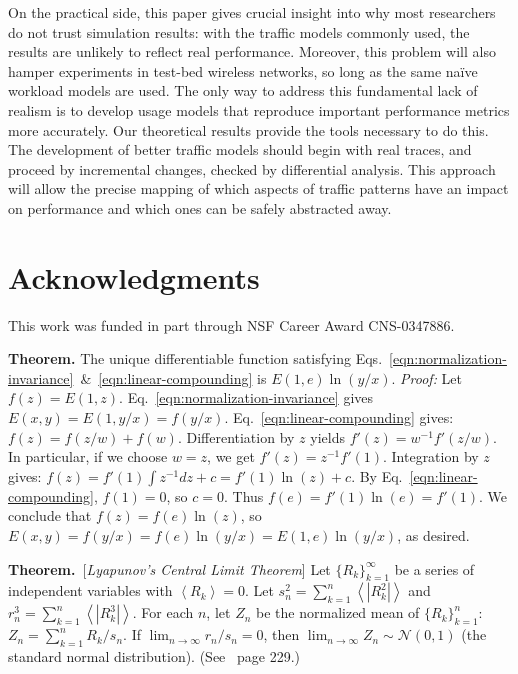 \documentclass[conference]{IEEEtran}
\newcommand{\E}[1]{\left<#1\right>}
\newcommand{\abs}[1]{\left|#1\right|}
\begin{document}
On the practical side, this paper gives crucial insight into why most researchers do not trust simulation results: with the traffic models commonly used, the results are unlikely to reflect real performance. Moreover, this problem will also hamper experiments in test-bed wireless networks, so long as the same na\"ive workload models are used. The only way to address this fundamental lack of realism is to develop usage models that reproduce important performance metrics more accurately. Our theoretical results provide the tools necessary to do this. The development of better traffic models should begin with real traces, and proceed by incremental changes, checked by differential analysis.
This approach will allow the precise mapping of which aspects of traffic patterns have an impact on performance and which ones can be safely abstracted away.

\section{Acknowledgments}
This work was funded in part through NSF Career Award CNS-0347886.

\vspace{-0.5em}
\appendix\footnotesize

\noindent
\textbf{Theorem.} The unique differentiable function satisfying Eqs.~\ref{eqn:normalization-invariance}~\&~\ref{eqn:linear-compounding} is $E(1,e) \ln(y/x)$. \textit{Proof:} Let $f(z) = E(1,z)$. Eq.~\ref{eqn:normalization-invariance} gives $E(x,y) = E(1,y/x) = f(y/x)$. Eq.~\ref{eqn:linear-compounding} gives: $f(z) = f(z/w) + f(w)$. Differentiation by $z$ yields $f'(z) = w^{-1} f'(z/w)$. In particular, if we choose $w=z$, we get $f'(z) = z^{-1} f'(1)$. Integration by $z$ gives:
$f(z) = f'(1) \int z^{-1} dz + c = f'(1) \ln(z) + c$.
By Eq.~\ref{eqn:linear-compounding}, $f(1)=0$, so $c=0$. Thus $f(e)=f'(1)\ln(e)=f'(1)$. We conclude that $f(z)=f(e)\ln(z)$, so $E(x,y) = f(y/x) = f(e)\ln(y/x) = E(1,e)\ln(y/x)$, as desired.\hfill\QED

\vspace{1em}\noindent
\textbf{Theorem.}~[\textit{Lyapunov's Central Limit Theorem}] Let $\{R_k\}_{k=1}^{\infty}$ be a series of independent variables with $\E{R_k}=0$. Let $s_n^2 = \sum_{k=1}^n{\E{\abs{R_k^2}}}$ and $r_n^3 = \sum_{k=1}^n{\E{\abs{R_k^3}}}$. For each $n$, let $Z_n$ be the normalized mean of $\{R_k\}_{k=1}^n$: $Z_n = \sum_{k=1}^n{R_k/s_n}$. If $\lim_{n\to\infty} {r_n/s_n} = 0$, then $\lim_{n\to\infty}{Z_n} \sim \mathcal{N}(0,1)$ (the standard normal distribution). (See~\cite{Feller68} page 229.)
\end{document}
